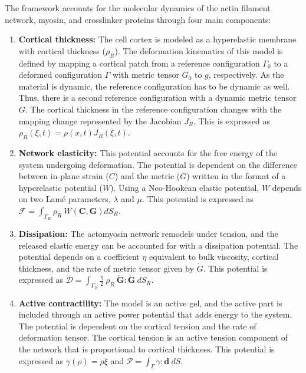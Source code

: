 The framework accounts for the molecular dynamics of the actin filament
network, myosin, and crosslinker proteins through four main components:

\begin{enumerate}
	\def\labelenumi{\arabic{enumi}.}
	\item
	\textbf{Cortical thickness:} The cell cortex is modeled as a
	hyperelastic membrane with cortical thickness (\(\rho_R\)). The
	deformation kinematics of this model is defined by mapping a cortical
	patch from a reference configuration \(\Gamma_0\) to a deformed
	configuration \(\Gamma\) with metric tensor \(G_0\) to \(g\),
	respectively. As the material is dynamic, the reference configuration
	has to be dynamic as well. Thus, there is a second reference
	configuration with a dynamic metric tensor \(G\). The cortical
	thickness in the reference configuration changes with the mapping
	change represented by the Jacobian \(J_R\). This is expressed as
	\(\rho_R(\xi, t) = \rho(x,t)J_R(\xi,t)\).
	\item
	\textbf{Network elasticity:} This potential accounts for the free
	energy of the system undergoing deformation. The potential is
	dependent on the difference between in-plane strain (\(C\)) and the
	metric (\(G\)) written in the format of a hyperelastic potential
	(\(W\)). Using a Neo-Hookean elastic potential, \(W\) depends on two
	Lamé parameters, \(\lambda\) and \(\mu\). This potential is expressed
	as \(\mathcal{F} = \int_{\Gamma_R} \rho_R \ W(\mathbf{C,G})dS_R\).
	\item
	\textbf{Dissipation:} The actomyosin network remodels under tension,
	and the released elastic energy can be accounted for with a
	dissipation potential. The potential depends on a coefficient \(\eta\)
	equivalent to bulk viscosity, cortical thickness, and the rate of
	metric tensor given by \(\dot{G}\). This potential is expressed as
	\(\mathcal{D} = \int_{\Gamma_R} \frac{\eta}{2}\ \rho_R \ \mathbf{\dot{G}}:\mathbf{\dot{G}} \ dS_R\).
	\item
	\textbf{Active contractility:} The model is an active gel, and the
	active part is included through an active power potential that adds
	energy to the system. The potential is dependent on the cortical
	tension and the rate of deformation tensor. The cortical tension is an
	active tension component of the network that is proportional to
	cortical thickness. This potential is expressed as
	\(\gamma(\rho) = \rho \xi\) and
	\(\mathcal{P} = \int_{\Gamma} \gamma : \mathbf{d} \ dS\).
\end{enumerate}

